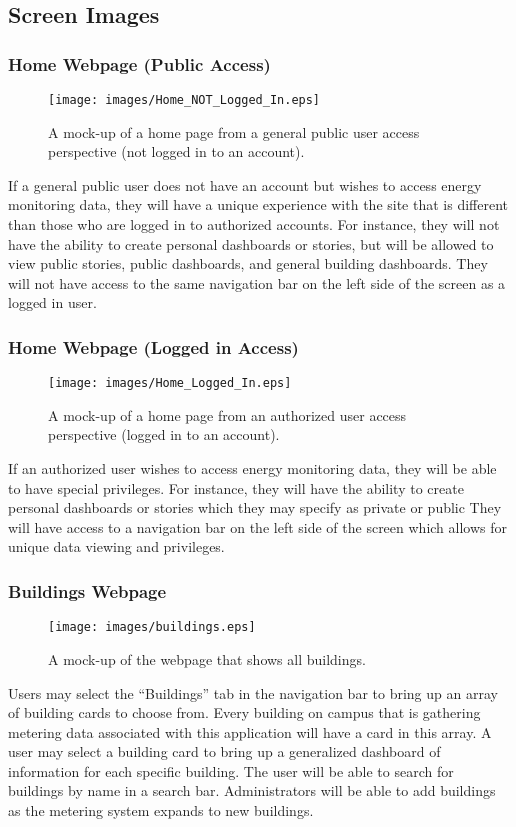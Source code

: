 \documentclass[journal,10pt,onecolumn,compsoc]{IEEEtran}
\begin{document}
	
    \subsection{Screen Images}
    
	\subsubsection{Home Webpage (Public Access)}
    \begin{figure}[H]
        \centering
        \texttt{[image: images/Home\_NOT\_Logged\_In.eps]}
        \caption{A mock-up of a home page from a general public user access perspective (not logged in to an account).}
    \end{figure}
	If a general public user does not have an account but wishes to access energy monitoring data, they will
	have a unique experience with the site that is different than those who are logged in to authorized accounts. 
	For instance, they will not have the ability to create personal dashboards or stories, but will be allowed to view
	public stories, public dashboards, and general building dashboards. They will not have access to the same navigation 
	bar on the left side of the screen as a logged in user. 
	
	\subsubsection{Home Webpage (Logged in Access)}
    \begin{figure}[H]
        \centering
        \texttt{[image: images/Home\_Logged\_In.eps]}
        \caption{A mock-up of a home page from an authorized user access perspective (logged in to an account).}
    \end{figure}
	If an authorized user wishes to access energy monitoring data, they will be able to have special privileges.
	For instance, they will have the ability to create personal dashboards or stories which they may specify as private or public
	They will have access to a navigation bar on the left side of the screen which allows for unique data viewing and privileges. 
	
	
    \subsubsection{Buildings Webpage} 
    \begin{figure}[H]
        \centering
        \texttt{[image: images/buildings.eps]}
        \caption{A mock-up of the webpage that shows all buildings.}
    \end{figure}
	Users may select the ``Buildings'' tab in the navigation bar to bring up an array of building cards to choose from.
	Every building on campus that is gathering metering data associated with this application will have a card in this array.
	A user may select a building card to bring up a generalized dashboard of information for each specific building. 
	The user will be able to search for buildings by name in a search bar. Administrators will be able to add buildings
	as the metering system expands to new buildings.
	
\end{document}
